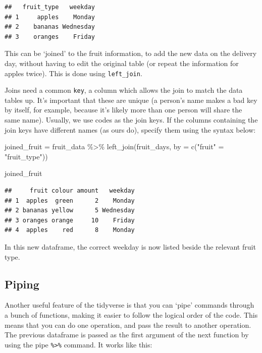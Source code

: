 \documentclass[
]{book}
\newenvironment{Shaded}{\begin{snugshade}}{\end{snugshade}}
\newcommand{\AttributeTok}[1]{\textcolor[rgb]{0.77,0.63,0.00}{#1}}
\newcommand{\FunctionTok}[1]{\textcolor[rgb]{0.00,0.00,0.00}{#1}}
\newcommand{\NormalTok}[1]{#1}
\newcommand{\OtherTok}[1]{\textcolor[rgb]{0.56,0.35,0.01}{#1}}
\newcommand{\SpecialCharTok}[1]{\textcolor[rgb]{0.00,0.00,0.00}{#1}}
\newcommand{\StringTok}[1]{\textcolor[rgb]{0.31,0.60,0.02}{#1}}
\begin{document}
\begin{verbatim}
##   fruit_type   weekday
## 1     apples    Monday
## 2    bananas Wednesday
## 3    oranges    Friday
\end{verbatim}

This can be `joined' to the fruit information, to add the new data on the delivery day, without having to edit the original table (or repeat the information for apples twice). This is done using \texttt{left\_join}.

Joins need a common \texttt{key}, a column which allows the join to match the data tables up. It's important that these are unique (a person's name makes a bad key by itself, for example, because it's likely more than one person will share the same name). Usually, we use codes as the join keys. If the columns containing the join keys have different names (as ours do), specify them using the syntax below:

\begin{Shaded}
\begin{Highlighting}[]
\NormalTok{joined\_fruit }\OtherTok{=}\NormalTok{ fruit\_data }\SpecialCharTok{\%\textgreater{}\%} \FunctionTok{left\_join}\NormalTok{(fruit\_days, }\AttributeTok{by =} \FunctionTok{c}\NormalTok{(}\StringTok{"fruit"} \OtherTok{=} \StringTok{"fruit\_type"}\NormalTok{))}

\NormalTok{joined\_fruit}
\end{Highlighting}
\end{Shaded}

\begin{verbatim}
##     fruit colour amount   weekday
## 1  apples  green      2    Monday
## 2 bananas yellow      5 Wednesday
## 3 oranges orange     10    Friday
## 4  apples    red      8    Monday
\end{verbatim}

In this new dataframe, the correct weekday is now listed beside the relevant fruit type.

\hypertarget{piping}{%
\subsection{Piping}\label{piping}}

Another useful feature of the tidyverse is that you can `pipe' commands through a bunch of functions, making it easier to follow the logical order of the code. This means that you can do one operation, and pass the result to another operation. The previous dataframe is passed as the first argument of the next function by using the pipe \texttt{\%\textgreater{}\%} command. It works like this:
\end{document}
